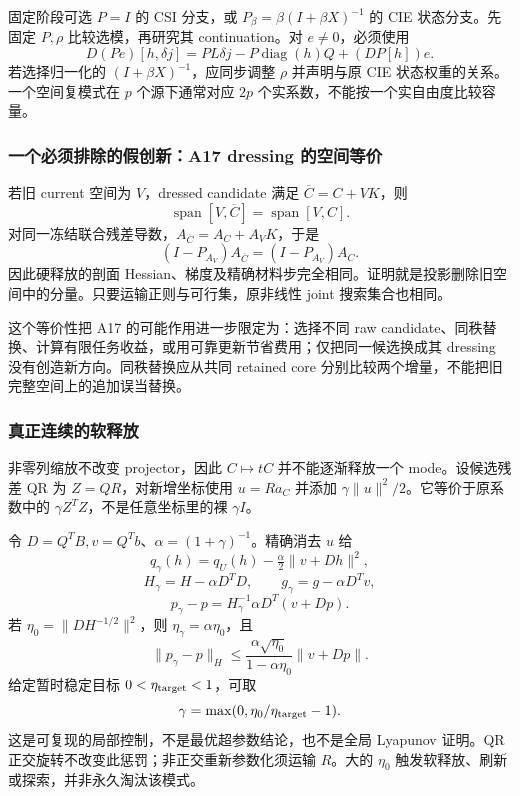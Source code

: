\documentclass[10pt,a4paper]{article}
\begin{document}
固定阶段可选 \(P=I\) 的 CSI 分支，或 \(P_\beta=\beta(I+\beta X)^{-1}\)
的 CIE 状态分支。先固定 \(P,\rho\) 比较选模，再研究其 continuation。对
\(e\ne0\)，必须使用
\[D(Pe)[h,\delta j]=PL\delta j-P\operatorname{diag}(h)Q+(DP[h])e.\]
若选择归一化的 \((I+\beta X)^{-1}\)，应同步调整 \(\rho\) 并声明与原 CIE
状态权重的关系。一个空间复模式在 \(p\) 个源下通常对应 \(2p\)
个实系数，不能按一个实自由度比较容量。

\hypertarget{ux4e00ux4e2aux5fc5ux987bux6392ux9664ux7684ux5047ux521bux65b0a17-dressing-ux7684ux7a7aux95f4ux7b49ux4ef7}{%
\subsubsection{一个必须排除的假创新：A17 dressing
的空间等价}\label{ux4e00ux4e2aux5fc5ux987bux6392ux9664ux7684ux5047ux521bux65b0a17-dressing-ux7684ux7a7aux95f4ux7b49ux4ef7}}

若旧 current 空间为 \(V\)，dressed candidate 满足
\(\overline C=C+VK\)，则
\[\operatorname{span}[V,\overline C]=\operatorname{span}[V,C].\]
对同一冻结联合残差导数，\(A_{\overline C}=A_C+A_VK\)，于是
\[\boxed{(I-P_{A_V})A_{\overline C}=(I-P_{A_V})A_C.}\] 因此硬释放的剖面
Hessian、梯度及精确材料步完全相同。证明就是投影删除旧空间中的分量。只要运输正则与可行集，原非线性
joint 搜索集合也相同。

这个等价性把 A17 的可能作用进一步限定为：选择不同 raw
candidate、同秩替换、计算有限任务收益，或用可靠更新节省费用；仅把同一候选换成其
dressing 没有创造新方向。同秩替换应从共同 retained core
分别比较两个增量，不能把旧完整空间上的追加误当替换。

\hypertarget{ux771fux6b63ux8fdeux7eedux7684ux8f6fux91caux653e}{%
\subsubsection{真正连续的软释放}\label{ux771fux6b63ux8fdeux7eedux7684ux8f6fux91caux653e}}

非零列缩放不改变 projector，因此 \(C\mapsto tC\) 并不能逐渐释放一个
mode。设候选残差 QR 为 \(Z=QR\)，对新增坐标使用 \(u=Ra_C\) 并添加
\(\gamma\|u\|^2/2\)。它等价于原系数中的
\(\gamma Z^TZ\)，不是任意坐标里的裸 \(\gamma I\)。

令 \(D=Q^TB,v=Q^Tb\)、\(\alpha=(1+\gamma)^{-1}\)。精确消去 \(u\) 给
\[q_\gamma(h)=q_U(h)-\tfrac\alpha2\|v+Dh\|^2,\]
\[H_\gamma=H-\alpha D^TD,\qquad g_\gamma=g-\alpha D^Tv,\]
\[p_\gamma-p=H_\gamma^{-1}\alpha D^T(v+Dp).\] 若
\(\eta_0=\|DH^{-1/2}\|^2\)，则 \(\eta_\gamma=\alpha\eta_0\)，且
\[\|p_\gamma-p\|_H\le
\frac{\alpha\sqrt{\eta_0}}{1-\alpha\eta_0}\|v+Dp\|.\] 给定暂时稳定目标
\(0<\eta_{\rm target}<1\)，可取
\[\gamma=\max(0,\eta_0/\eta_{\rm target}-1).\]
这是可复现的局部控制，不是最优超参数结论，也不是全局 Lyapunov 证明。QR
正交旋转不改变此惩罚；非正交重新参数化须运输 \(R\)。大的 \(\eta_0\)
触发软释放、刷新或探索，并非永久淘汰该模式。
\end{document}
